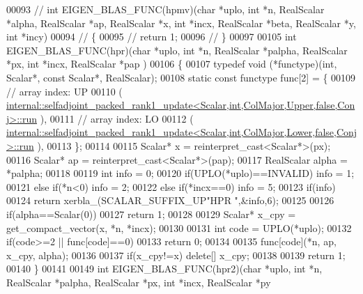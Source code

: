 \begin{DoxyCode}
00093 \textcolor{comment}{// int EIGEN\_BLAS\_FUNC(hpmv)(char *uplo, int *n, RealScalar *alpha, RealScalar *ap, RealScalar *x, int
       *incx, RealScalar *beta, RealScalar *y, int *incy)}
00094 \textcolor{comment}{// \{}
00095 \textcolor{comment}{//   return 1;}
00096 \textcolor{comment}{// \}}
00097 
00105 \textcolor{keywordtype}{int} EIGEN\_BLAS\_FUNC(hpr)(\textcolor{keywordtype}{char} *uplo, \textcolor{keywordtype}{int} *n, RealScalar *palpha, RealScalar *px, \textcolor{keywordtype}{int} *incx, RealScalar *pap
      )
00106 \{
00107   \textcolor{keyword}{typedef} void (*functype)(int, Scalar*, \textcolor{keyword}{const} Scalar*, RealScalar);
00108   \textcolor{keyword}{static} \textcolor{keyword}{const} functype func[2] = \{
00109     \textcolor{comment}{// array index: UP}
00110     (
      \hyperlink{structinternal_1_1selfadjoint__packed__rank1__update}{internal::selfadjoint\_packed\_rank1\_update<Scalar,int,ColMajor,Upper,false,Conj>::run}
      ),
00111     \textcolor{comment}{// array index: LO}
00112     (
      \hyperlink{structinternal_1_1selfadjoint__packed__rank1__update}{internal::selfadjoint\_packed\_rank1\_update<Scalar,int,ColMajor,Lower,false,Conj>::run}
      ),
00113   \};
00114 
00115   Scalar* x = \textcolor{keyword}{reinterpret\_cast<}Scalar*\textcolor{keyword}{>}(px);
00116   Scalar* ap = \textcolor{keyword}{reinterpret\_cast<}Scalar*\textcolor{keyword}{>}(pap);
00117   RealScalar alpha = *palpha;
00118 
00119   \textcolor{keywordtype}{int} info = 0;
00120   \textcolor{keywordflow}{if}(UPLO(*uplo)==INVALID)                                            info = 1;
00121   \textcolor{keywordflow}{else} \textcolor{keywordflow}{if}(*n<0)                                                       info = 2;
00122   \textcolor{keywordflow}{else} \textcolor{keywordflow}{if}(*incx==0)                                                   info = 5;
00123   \textcolor{keywordflow}{if}(info)
00124     \textcolor{keywordflow}{return} xerbla\_(SCALAR\_SUFFIX\_UP\textcolor{stringliteral}{"HPR  "},&info,6);
00125 
00126   \textcolor{keywordflow}{if}(alpha==Scalar(0))
00127     \textcolor{keywordflow}{return} 1;
00128 
00129   Scalar* x\_cpy = get\_compact\_vector(x, *n, *incx);
00130 
00131   \textcolor{keywordtype}{int} code = UPLO(*uplo);
00132   \textcolor{keywordflow}{if}(code>=2 || func[code]==0)
00133     \textcolor{keywordflow}{return} 0;
00134 
00135   func[code](*n, ap, x\_cpy, alpha);
00136 
00137   \textcolor{keywordflow}{if}(x\_cpy!=x)  \textcolor{keyword}{delete}[] x\_cpy;
00138 
00139   \textcolor{keywordflow}{return} 1;
00140 \}
00141 
00149 \textcolor{keywordtype}{int} EIGEN\_BLAS\_FUNC(hpr2)(\textcolor{keywordtype}{char} *uplo, \textcolor{keywordtype}{int} *n, RealScalar *palpha, RealScalar *px, \textcolor{keywordtype}{int} *incx, RealScalar *py

\end{DoxyCode}
